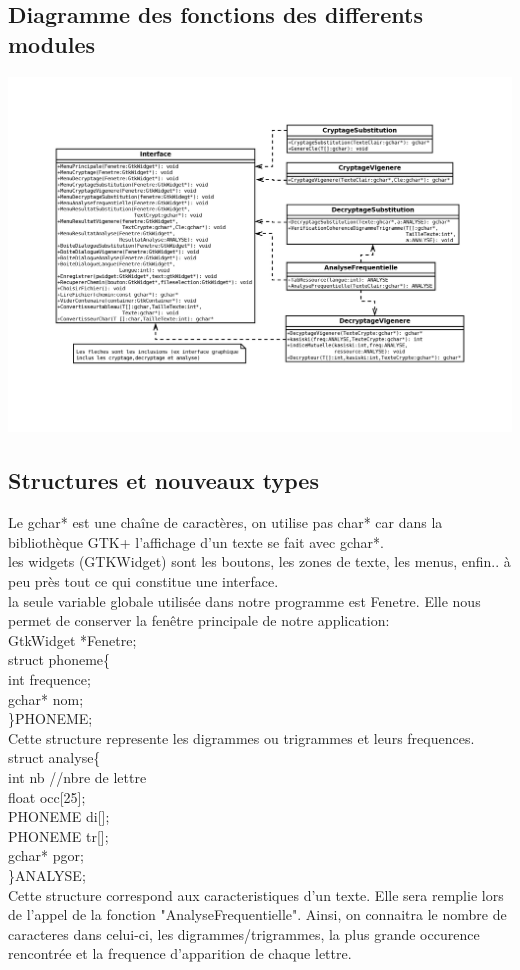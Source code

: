 \documentclass[a4]{article}
\begin{document}
		\subsection{Diagramme des fonctions des differents modules}
		\includegraphics[scale=0.8]{diaa.jpg}
		\subsection{Structures et nouveaux types}
		Le gchar* est une chaîne de caractères, on utilise pas char* car dans la bibliothèque
		GTK+ l'affichage d'un texte se fait avec gchar*.\\
		
		les widgets (GTKWidget) sont les boutons, les zones de texte, les menus, enfin.. à peu 
		près tout ce qui constitue une interface.\\
		
		la seule  variable globale utilisée dans notre programme est Fenetre. Elle nous permet de
		conserver la fenêtre principale de notre application:\\
		GtkWidget *Fenetre; \\
		
	struct phoneme\{\\
		int frequence;\\
		gchar* nom;\\
	\}PHONEME;\\
	Cette structure represente les digrammes ou trigrammes et leurs frequences.\\
	
	struct analyse\{ \\
		int nb //nbre de lettre \\
		float occ[25];\\
		PHONEME di[];\\
		PHONEME tr[];\\
		gchar* pgor;\\
	\}ANALYSE;\\
	Cette structure correspond aux caracteristiques d'un texte. Elle sera remplie lors de
	l'appel de la fonction "AnalyseFrequentielle". Ainsi, on connaitra
	le nombre de caracteres dans celui-ci, les digrammes/trigrammes, la plus grande occurence
	rencontrée et la frequence d'apparition de chaque lettre.\\
	
\end{document}
